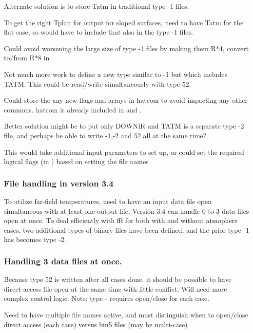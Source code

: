  Alternate solution is to store Tatm in traditional type -1 files.

To get the right Tplan for output for sloped surfaces, need to have Tatm for the flat case, so would have to include that also in the type -1 files.

Could avoid worsening the large size of type -1 files by making them R*4, convert to/from R*8 in 

Not much more work to define a new type similar to -1 but which includes TATM. This could be read/write simultaneously with type 52.

Could store the any new flags and arrays  in hatcom to avoid impacting any other commons. hatcom is already included in  and .


Better solution might be to put only  DOWNIR and TATM  is a separate type -2 file, 
 and perhaps be able to write -1,-2 and 52 all at the same time?

 This would take additional input parameters to set up, or could set the required logical flags (in ) based on setting the file names

\subsubsection{File handling in version 3.4 \label{mint}}
 To utilize far-field  temperatures, need to have an input data file
 open simultaneous with at least one output file. Version 3.4 can handle 0 to 3
 data files open at once. To deal efficiently with fff for both with and without
 atmophere cases, two additional types of binary files have been defined, and
 the prior type -1 has becomes type -2.

\subsubsection{ Handling 3 data files at once. \label{help}}
Because type 52 is written after all cases done, it should be possible to have direct-access file open at the same time with little conflict. Will need more complex control logic.  Note: type - requires open/close for each case.

Need to have multiple file names active, and  must distinguish when to open/close direct access (each case) versus bin5 files (may be multi-case) 

